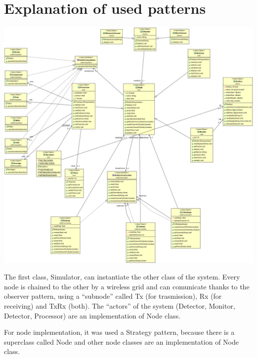 \documentclass[a4paper,titlepage]{article}
\begin{document}
\newpage
\section*{Explanation of used patterns}

    \begin{center}

    \centering
    \includegraphics[scale=0.30]{ClassDiagram.png}

    \end{center}


The first class, Simulator, can instantiate the other class of the system. Every node is chained to the other by a wireless grid and can comunicate thanks to the observer pattern, using a ``subnode'' called Tx (for trasmission), Rx (for receiving) and TxRx (both). The ``actors'' of the system (Detector, Monitor, Detector, Processor) are an implementation of Node class.

For node implementation, it was used a Strategy pattern, because there is a superclass called Node and other node classes are an implementation of Node class.
\end{document}
